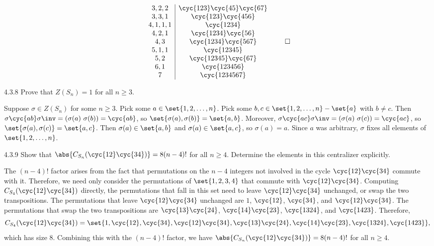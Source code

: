 \begin{sol}
\[\begin{array}{c|c}
			3, 2, 2 & \cyc{1 2 3}\cyc{4 5}\cyc{6 7} \\
			3, 3, 1 & \cyc{1 2 3}\cyc{4 5 6} \\
			4, 1, 1, 1 & \cyc{1 2 3 4} \\
			4, 2, 1 & \cyc{1 2 3 4}\cyc{5 6} \\
			4, 3 & \cyc{1 2 3 4}\cyc{5 6 7} \\
			5, 1, 1 & \cyc{1 2 3 4 5} \\
			5, 2 & \cyc{1 2 3 4 5}\cyc{6 7} \\
			6, 1 & \cyc{1 2 3 4 5 6} \\
			7 & \cyc{1 2 3 4 5 6 7}
		\end{array} \qedhere
	\]
\end{sol}

\begin{exercise}{4.3.8}
	Prove that $Z(S_n)=1$ for all $n \geq 3$.
\end{exercise}

\begin{sol}
	Suppose $\sigma \in Z(S_n)$ for some $n \geq 3$.
	Pick some $a \in \set{1, 2, \ldots, n}$.
	Pick some $b, c \in \set{1, 2, \ldots, n} - \set{a}$ with $b \neq c$.
	Then $\sigma\cyc{a b}\sigma\inv = (\sigma(a)\ \sigma(b)) = \cyc{a b}$, so $\set{\sigma(a), \sigma(b)} = \set{a, b}$.
	Moreover, $\sigma\cyc{a c}\sigma\inv = (\sigma(a)\ \sigma(c)) = \cyc{a c}$, so $\set{\sigma(a), \sigma(c)} = \set{a, c}$.
	Then $\sigma(a) \in \set{a, b}$ and $\sigma(a) \in \set{a, c}$, so $\sigma(a) = a$.
	Since $a$ was arbitrary, $\sigma$ fixes all elements of $\set{1, 2, \ldots, n}$.
\end{sol}

\begin{exercise}{4.3.9}
	Show that $\abs{C_{S_n}(\cyc{1 2}\cyc{3 4})} = 8 (n-4)!$ for all $n \geq 4$.
	Determine the elements in this centralizer explicitly.
\end{exercise}

\begin{sol}
	The $(n - 4)!$ factor arises from the fact that permutations on the $n - 4$ integers not involved in the cycle $\cyc{1 2}\cyc{3 4}$ commute with it.
	Therefore, we need only consider the permutations of $\set{1, 2, 3, 4}$ that commute with $\cyc{1 2}\cyc{3 4}$.
	Computing $C_{S_4}(\cyc{1 2}\cyc{3 4})$ directly, the permutations that fall in this set need to leave $\cyc{1 2}\cyc{3 4}$ unchanged, or swap the two transpositions.
	The permutations that leave $\cyc{1 2}\cyc{3 4}$ unchanged are $1$, $\cyc{1 2}$, $\cyc{3 4}$, and $\cyc{1 2}\cyc{3 4}$.
	The permutations that swap the two transpositions are $\cyc{1 3}\cyc{2 4}$, $\cyc{1 4}\cyc{2 3}$, $\cyc{1 3 2 4}$, and $\cyc{1 4 2 3}$.
	Therefore, 
	\[
		C_{S_4}(\cyc{1 2}\cyc{3 4}) = \set{1, \cyc{1 2}, \cyc{3 4}, \cyc{1 2}\cyc{3 4}, \cyc{1 3}\cyc{2 4}, \cyc{1 4}\cyc{2 3}, \cyc{1 3 2 4}, \cyc{1 4 2 3}},
	\]
	which has size 8.
	Combining this with the $(n - 4)!$ factor, we have $\abs{C_{S_n}(\cyc{1 2}\cyc{3 4})} = 8(n - 4)!$ for all $n \geq 4$.
\end{sol}

